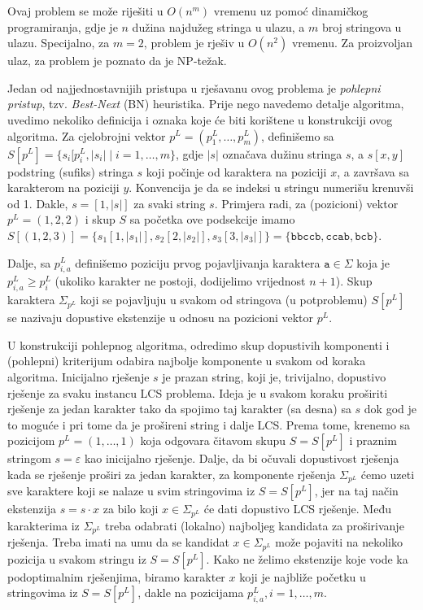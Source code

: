 \documentclass[a4paper, utf8, 11pt, colorlinks]{book}
\theoremstyle{definition}
\begin{document}
 
 Ovaj problem se može riješiti u $O(n^m)$ vremenu uz pomoć dinamičkog programiranja, gdje je $n$ dužina najdužeg stringa u ulazu, a $m$ broj stringova u ulazu. Specijalno, za  $m=2$, problem je rješiv u $O(n^2)$ vremenu. Za proizvoljan ulaz, za problem je poznato da je NP-težak.  


Jedan od najjednostavnijih pristupa u rješavanu ovog problema je  \emph{pohlepni pristup}, tzv. \emph{Best-Next} (BN) heuristika. Prije nego navedemo detalje algoritma, uvedimo nekoliko definicija i oznaka koje će biti korištene u konstrukciji ovog algoritma. Za cjelobrojni vektor $p^L = (p^L_1,\ldots, p^L_m)$, definišemo sa
$S[p^L] = \{s_i[p^L_i, |s_i| \mid i=1,\ldots,m\}$, gdje $|s|$ označava dužinu stringa $s$, a $s[x,y]$ podstring (sufiks) stringa $s$ koji počinje od karaktera na poziciji $x$, a završava sa karakterom na poziciji $y$. Konvencija je da se indeksi u stringu numerišu krenuvši od 1. Dakle, $s= [1, |s|]$ za svaki string $s$. Primjera radi, za (pozicioni) vektor $p^L=(1,2,2)$ i skup $S$ sa početka ove podsekcije imamo $S[ (1,2,3)] = \{ s_1[1, |s_1|], s_2[2, |s_2|], s_3[3, |s_3|]  \}= \{ \texttt{bbccb}, \texttt{ccab}, \texttt{bcb}\}$. 
 
Dalje, sa $p^L_{i,a}$ definišemo poziciju prvog pojavljivanja karaktera $\texttt{a}\in \Sigma$ koja je  $p^L_{i,a} \geq p^L_i$ (ukoliko karakter ne postoji, dodijelimo vrijednost $n+1$). Skup karaktera $\Sigma_{p^L}$ koji se pojavljuju u svakom od stringova (u potproblemu) $S[p^L]$ se nazivaju dopustive ekstenzije u odnosu na pozicioni vektor $p^L$. 

U konstrukciji pohlepnog algoritma, odredimo  skup dopustivih komponenti i (pohlepni) kriterijum odabira najbolje komponente u svakom od koraka algoritma. Inicijalno rješenje $s$ je prazan string, koji je, trivijalno, dopustivo rješenje za svaku instancu LCS problema. Ideja je u svakom koraku proširiti rješenje za jedan karakter tako da spojimo taj karakter (sa desna) sa $s$  dok god je to moguće i pri tome da je prošireni string i dalje LCS. Prema tome, krenemo sa pozicijom $p^L = (1, \ldots, 1)$ koja odgovara čitavom skupu $S=S[p^L]$ i praznim stringom $s =\varepsilon$ kao inicijalno rješenje. Dalje, da bi očuvali dopustivost rješenja kada se rješenje proširi za jedan karakter, za komponente rješenja $\Sigma_{p^L}$ ćemo uzeti sve karaktere koji se nalaze u svim stringovima iz $S=S[p^L]$, jer na taj način  ekstenzija $s = s \cdot x$ za bilo koji $x \in \Sigma_{p^L}$ će dati dopustivo LCS rješenje. Među karakterima iz $\Sigma_{p^L}$ treba odabrati (lokalno) najboljeg kandidata za proširivanje rješenja. Treba imati na umu da se kandidat $x\in \Sigma_{p^L}$ može pojaviti na nekoliko pozicija u svakom stringu iz $S=S[p^L]$. Kako ne želimo ekstenzije koje vode ka podoptimalnim rješenjima, biramo karakter $x$ koji je najbliže početku u stringovima iz $S=S[p^L]$, dakle na pozicijama $p^L_{i,a},i=1,\ldots,m$. 
\end{document}
